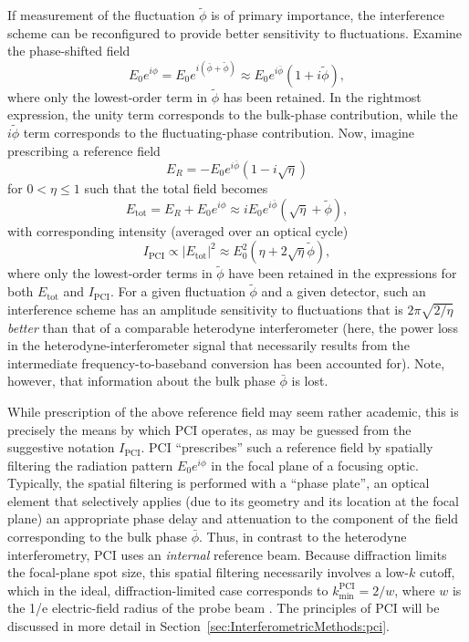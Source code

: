 If measurement of the fluctuation $\tilde{\phi}$ is of primary importance,
the interference scheme can be reconfigured
to provide better sensitivity to fluctuations.
Examine the phase-shifted field
\begin{equation}
  E_0 e^{i \phi}
  =
  E_0 e^{i \left( \bar{\phi} + \tilde{\phi} \right)}
  \approx
  E_0 e^{i \bar{\phi}} \left( 1 + i \tilde{\phi} \right),
\end{equation}
where only the lowest-order term in $\tilde{\phi}$ has been retained.
In the rightmost expression,
the unity term corresponds to the bulk-phase contribution, while
the $i \tilde{\phi}$ term corresponds to the fluctuating-phase contribution.
Now, imagine prescribing a reference field
\begin{equation}
  E_R = -E_0 e^{i \bar{\phi}} \left( 1 - i \sqrt{\eta} \right)
\end{equation}
for $0 < \eta \leq 1$ such that the total field becomes
\begin{equation}
  E_{\text{tot}}
  =
  E_R + E_0 e^{i \phi}
  \approx
  i E_0 e^{i \bar{\phi}} \left( \sqrt{\eta} + \tilde{\phi} \right),
\end{equation}
with corresponding intensity (averaged over an optical cycle)
\begin{equation}
  I_{\text{PCI}}
  \propto
  |E_{\text{tot}}|^2
  \approx
  E_0^2 \left( \eta + 2 \sqrt{\eta} \tilde{\phi} \right),
  \label{eq:Introduction:OpticalInterferometry:PCI:intensity}
\end{equation}
where only the lowest-order terms in $\tilde{\phi}$
have been retained in the expressions
for both $E_{\text{tot}}$ and $I_{\text{PCI}}$.
For a given fluctuation $\tilde{\phi}$ and a given detector,
such an interference scheme has an amplitude sensitivity to fluctuations
that is $2 \pi \sqrt{2 / \eta}$ \emph{better}
than that of a comparable heterodyne interferometer
(here, the power loss in the heterodyne-interferometer signal
that necessarily results from the intermediate frequency-to-baseband conversion
has been accounted for).
Note, however, that information about the bulk phase $\bar{\phi}$ is lost.

While prescription of the above reference field may seem rather academic,
this is precisely the means by which PCI operates,
as may be guessed from the suggestive notation $I_{\text{PCI}}$.
PCI ``prescribes'' such a reference field
by spatially filtering the radiation pattern $E_0 e^{i \phi}$
in the focal plane of a focusing optic.
Typically, the spatial filtering is performed with a ``phase plate'',
an optical element that selectively applies
(due to its geometry and its location at the focal plane)
an appropriate phase delay and attenuation
to the component of the field corresponding to the bulk phase $\bar{\phi}$.
Thus, in contrast to the heterodyne interferometry,
PCI uses an \emph{internal} reference beam.
Because diffraction limits the focal-plane spot size,
this spatial filtering necessarily involves a low-$k$ cutoff,
which in the ideal, diffraction-limited case corresponds to
$k_{\text{min}}^{\text{PCI}} = 2 / w$,
where $w$ is the 1/e electric-field radius of the probe beam
\cite{dorris_rsi09}.
The principles of PCI will be discussed in more detail in
Section~\ref{sec:InterferometricMethods:pci}.

